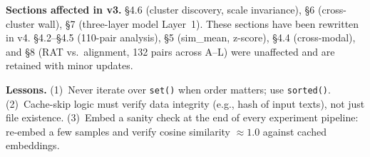 \documentclass{article}
\begin{document}
\textbf{Sections affected in v3.} \S4.6 (cluster discovery, scale invariance), \S6 (cross-cluster wall), \S7 (three-layer model Layer~1). These sections have been rewritten in v4. \S4.2--\S4.5 (110-pair analysis), \S5 (sim\_mean, z-score), \S4.4 (cross-modal), and \S8 (RAT vs.\ alignment, 132 pairs across A--L) were unaffected and are retained with minor updates.

\textbf{Lessons.} (1)~Never iterate over \texttt{set()} when order matters; use \texttt{sorted()}. (2)~Cache-skip logic must verify data integrity (e.g., hash of input texts), not just file existence. (3)~Embed a sanity check at the end of every experiment pipeline: re-embed a few samples and verify cosine similarity $\approx 1.0$ against cached embeddings.
\end{document}
